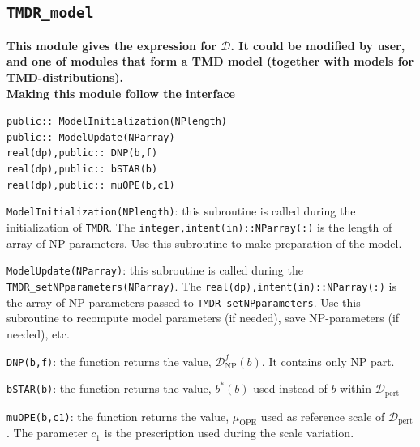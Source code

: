 \documentclass[prd,nofootinbib,eqsecnum,final]{revtex4}
\renewcommand{\(}{\left(}
\renewcommand{\)}{\right)}
\renewcommand{\[}{\left[}
\renewcommand{\]}{\right]}
\newcommand{\blue}[1]{{\color{blue} #1}}
\begin{document}
\subsection{\texttt{TMDR\_model}}

\begin{tcolorbox}
\begin{center}
\textbf{This module gives the expression for $\mathcal{D}$. It could be modified by user, and one of modules that form a TMD model (together with models for TMD-distributions).}
\\
\textbf{\blue{Making this module follow the interface}}
\end{center}
\texttt{public:: ModelInitialization(NPlength)}
\\
\texttt{public:: ModelUpdate(NParray)}
\\
\texttt{real(dp),public:: DNP(b,f)}
\\
\texttt{real(dp),public:: bSTAR(b)}
\\
\texttt{real(dp),public:: muOPE(b,c1)}
\end{tcolorbox}

\texttt{ModelInitialization(NPlength)}: this subroutine is called during the initialization of \texttt{TMDR}. The \texttt{integer,intent(in)::NParray(:)} is the length of array of NP-parameters. Use this subroutine to make preparation of the model.

\vspace{2mm}

\texttt{ModelUpdate(NParray)}: this subroutine is called during the \texttt{TMDR\_setNPparameters(NParray)}. The \texttt{real(dp),intent(in)::NParray(:)} is the array of NP-parameters passed to \texttt{TMDR\_setNPparameters}. Use this subroutine to recompute model parameters (if needed), save NP-parameters (if needed), etc.

\vspace{2mm}

\texttt{DNP(b,f)}: the function returns the value, $\mathcal{D}^f_{\text{NP}}(b)$. It contains only NP part. 

\vspace{2mm}

\texttt{bSTAR(b)}: the function returns the value, $b^*(b)$ used instead of $b$ within $\mathcal{D}_{\text{pert}}$

\vspace{2mm}

\texttt{muOPE(b,c1)}: the function returns the value, $\mu_{\text{OPE}}$ used as reference scale of $\mathcal{D}_{\text{pert}}$. The parameter $c_1$ is the prescription used during the scale variation.
\end{document}
